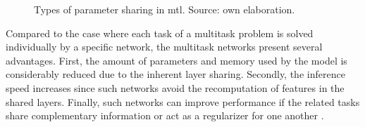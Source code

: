 \begin{figure}[ht]
\centering
{}
\hfill
{}    
\caption{Types of parameter sharing in \acl{mtl}. Source: own elaboration.}
\label{fig:mtl_sharing}
\end{figure}

Compared to the case where each task of a multitask problem is solved individually by a specific network, the multitask networks present several advantages. First, the amount of parameters and memory used by the model is considerably reduced due to the inherent layer sharing. Secondly, the inference speed increases since such networks avoid the recomputation of features in the shared layers. Finally, such networks can improve performance if the related tasks share complementary information or act as a regularizer for one another \citep{vandenhende2021multi}. 



